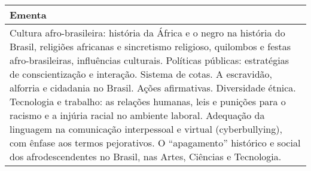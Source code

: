 \begin{quadro}[h!]
\begin{tabular}{|p{3cm} p{2cm} p{3cm} p{2cm} p{3cm} p{2cm}|}
\multicolumn{6}{|p{15cm}|}{\cellcolor{blue1} Ementa} \\\hline
\hline\multicolumn{6}{|p{15cm}|}{\scriptsize Cultura afro-brasileira: história da África e o negro na história do Brasil, religiões africanas e sincretismo religioso, quilombos e festas afro-brasileiras, influências culturais. Políticas públicas: estratégias de conscientização e interação. Sistema de cotas. A escravidão, alforria e cidadania no Brasil. Ações afirmativas. Diversidade étnica. Tecnologia e trabalho:  as relações humanas, leis e punições para o racismo e a injúria racial no ambiente laboral. Adequação da linguagem na comunicação interpessoal e virtual (cyberbullying), com ênfase   aos termos pejorativos. O ``apagamento'' histórico e social dos afrodescendentes no Brasil, nas Artes, Ciências e Tecnologia.}\\\hline
\hline
	\end{tabular}
\end{quadro}
